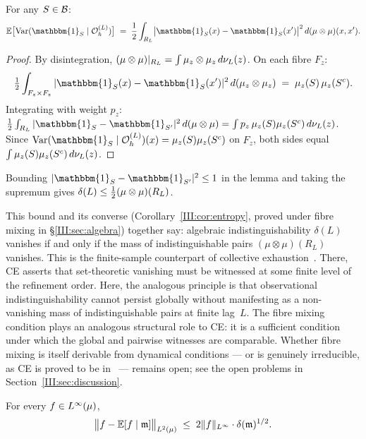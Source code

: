 \begin{lemma}
\label{III:lem:cond-var}
For any $S \in \mathcal{B}$:
\[
  \mathbb{E}\bigl[\mathrm{Var}(\mathbbm{1}_S \mid \OhL)\bigr]
  \;=\;
  \frac{1}{2}
  \int_{\RL}
  \bigl|\mathbbm{1}_S(x) - \mathbbm{1}_S(x')\bigr|^2
  \,d(\mu \otimes \mu)(x,x').
\]
\end{lemma}

\begin{proof}
By disintegration, $(\mu \otimes \mu)|_{R_L} = \int \mu_z \otimes \mu_z\,d\nu_L(z)$.
On each fibre $F_z$:
\[
  \tfrac{1}{2}\int_{F_z \times F_z}
    |\mathbbm{1}_S(x) - \mathbbm{1}_S(x')|^2
    \,d(\mu_z \otimes \mu_z)
  \;=\; \mu_z(S)\,\mu_z(S^c).
\]
Integrating with weight $p_z$:
$\tfrac{1}{2}\int_{\RL}|\mathbbm{1}_S - \mathbbm{1}_{S'}|^2\,d(\mu\otimes\mu)
= \int p_z\,\mu_z(S)\mu_z(S^c)\,d\nuL(z)$.
Since $\mathrm{Var}(\mathbbm{1}_S \mid \OhL)(x) = \mu_z(S)\mu_z(S^c)$ on $F_z$,
both sides equal $\int \mu_z(S)\mu_z(S^c)\,d\nu_L(z)$.
\end{proof}

Bounding $|\mathbbm{1}_S - \mathbbm{1}_{S'}|^2 \leq 1$ in the lemma and taking the supremum
gives $\delta(L) \leq \tfrac{1}{2}(\mu\otimes\mu)(R_L)$.

\begin{remark}
This bound and its converse (Corollary~\ref{III:cor:entropy}, proved
under fibre mixing in \S\ref{III:sec:algebra}) together say: algebraic
indistinguishability $\delta(L)$ vanishes if and only if the mass of
indistinguishable pairs $(\mu\otimes\mu)(R_L)$ vanishes.  This is the
finite-sample counterpart of collective exhaustion~\cite{mahon_paper1}.  There, CE
asserts that set-theoretic vanishing must be witnessed at some finite level of
the refinement order.  Here, the analogous principle is that observational
indistinguishability cannot persist globally without manifesting as a
non-vanishing mass of indistinguishable pairs at finite lag~$L$.  The fibre
mixing condition plays an analogous structural role to CE: it is a sufficient
condition under which the global and pairwise witnesses are comparable.
Whether fibre mixing is itself derivable from dynamical conditions --- or is
genuinely irreducible, as CE is proved to be in~\cite{mahon_paper1} --- remains open;
see the open problems in Section~\ref{III:sec:discussion}.
\end{remark}

\begin{lemma}
\label{III:lem:bias}
For every $f \in L^{\infty}(\mu)$,
\[
  \bigl\| f - \mathbb{E}[f \mid \mathfrak{m}] \bigr\|_{L^{2}(\mu)}
  \;\leq\;
  2\|f\|_{L^{\infty}} \cdot \delta(\mathfrak{m})^{1/2}.
\]
\end{lemma}

